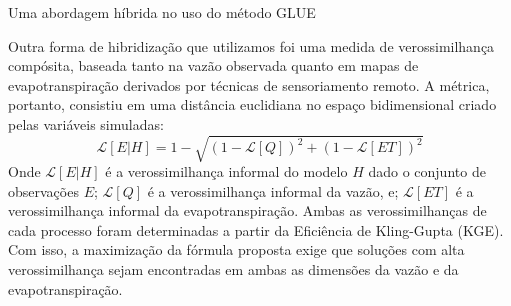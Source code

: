 \documentclass[./main.tex]{subfiles}
\begin{document}
\begin{simplebox}[
    float=ht!,
    label={destaque_abordagem_hibrida},
    nameref={Exploração híbrida}
    ]{Uma abordagem híbrida no uso do método GLUE}
    \begin{minipage}[t]{\linewidth}    
    \par Outra forma de hibridização que utilizamos foi uma medida de verossimilhança compósita, baseada tanto na vazão observada quanto em mapas de evapotranspiração derivados por técnicas de sensoriamento remoto. A métrica, portanto, consistiu em uma distância euclidiana no espaço bidimensional criado pelas variáveis simuladas:
    \begin{equation}
        \label{eq:likelihood}
        \mathcal{L}[E|H] = 1 - \sqrt{(1 - \mathcal{L}[Q])^2 + (1 - \mathcal{L}[ET])^2}
    \end{equation}
   Onde $\mathcal{L}[E|H]$ é a verossimilhança informal do modelo $H$ dado o conjunto de observações $E$; $\mathcal{L}[Q]$ é a verossimilhança informal da vazão, e; $\mathcal{L}[ET]$ é a verossimilhança informal da evapotranspiração. Ambas as verossimilhanças de cada processo foram determinadas a partir da Eficiência de Kling-Gupta (\textsf{\small{KGE}}). Com isso, a maximização da fórmula proposta exige que soluções com alta verossimilhança sejam encontradas em ambas as dimensões da vazão e da evapotranspiração.
    \end{minipage}
\label{box:glue}
\normalsize
\end{simplebox}
\end{document}
